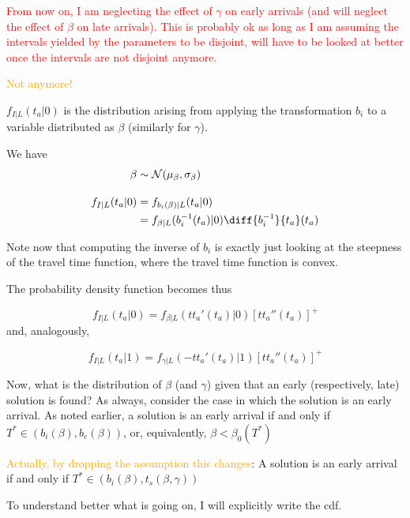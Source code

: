 \documentclass{article}
\begin{document}
\textcolor{red}{From now on, I am neglecting the effect of $\gamma$ on early arrivals (and will neglect the effect of $\beta$ on late arrivals). This is probably ok as long as I am assuming the intervals yielded by the parameters to be disjoint, will have to be looked at better once the intervals are not disjoint anymore.}

\textcolor{orange}{Not anymore!}

\(f_{I | L}(t_a | 0)\) is the distribution arising from applying the transformation \(b_i\) to a variable distributed as \(\beta\) (similarly for \(\gamma\)).

We have
\begin{align}
  \label{eq:pdf_bi}
  \begin{split}
    \beta & \sim \mathcal{N}(\mu_\beta, \sigma_\beta) \\[1em]
    f_{I | L}(t_a | 0) & = f_{b_i(\beta) | L}(t_a | 0) \\
    & = f_{\beta | L}(b_i^{-1}(t_a) | 0)\diff{b_i^{-1}}{t_a}(t_a)
  \end{split}
\end{align}

Note now that computing the inverse of \(b_i\) is exactly just looking at the steepness of the travel time function, where the travel time function is convex.

The probability density function becomes thus

\begin{equation}
  \label{eq:pdf_early}
  f_{I | L}(t_a | 0) = f_{\beta | L}(tt_a'(t_a) | 0)[tt_a''(t_a)]^+
\end{equation}
and, analogously,

\begin{equation}
  \label{eq:pdf_late}
  f_{I | L}(t_a | 1) = f_{\gamma | L}(-tt_a'(t_a) | 1)[tt_a''(t_a)]^+
\end{equation}

Now, what is the distribution of \(\beta\) (and \(\gamma\)) given that an early (respectively, late) solution is found?
As always, consider the case in which the solution is an early arrival.
As noted earlier, a solution is an early arrival if and only if \(T^* \in (b_i(\beta), b_e(\beta))\), or, equivalently, \(\beta < \beta_0(T^*)\)

\textcolor{orange}{Actually, by dropping the assumption this changes}:
A solution is an early arrival if and only if \(T^* \in (b_i(\beta), t_s(\beta, \gamma))\)

To understand better what is going on, I will explicitly write the cdf.
\end{document}
